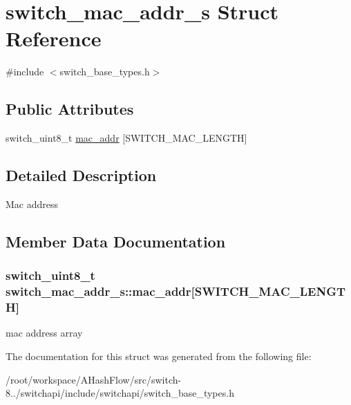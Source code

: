 \hypertarget{structswitch__mac__addr__s}{\section{switch\+\_\+mac\+\_\+addr\+\_\+s Struct Reference}
\label{structswitch__mac__addr__s}
}


{\ttfamily \#include $<$switch\+\_\+base\+\_\+types.\+h$>$}

\subsection*{Public Attributes}
\begin{DoxyCompactItemize}
\item 
switch\+\_\+uint8\+\_\+t \hyperlink{structswitch__mac__addr__s_a9d20acc7562e8be04135fa0e524649e2}{mac\+\_\+addr} \mbox{[}S\+W\+I\+T\+C\+H\+\_\+\+M\+A\+C\+\_\+\+L\+E\+N\+G\+T\+H\mbox{]}
\end{DoxyCompactItemize}


\subsection{Detailed Description}
Mac address 

\subsection{Member Data Documentation}
\hypertarget{structswitch__mac__addr__s_a9d20acc7562e8be04135fa0e524649e2}{
\subsubsection[{mac\+\_\+addr}]{\setlength{\rightskip}{0pt plus 5cm}switch\+\_\+uint8\+\_\+t switch\+\_\+mac\+\_\+addr\+\_\+s\+::mac\+\_\+addr\mbox{[}S\+W\+I\+T\+C\+H\+\_\+\+M\+A\+C\+\_\+\+L\+E\+N\+G\+T\+H\mbox{]}}}\label{structswitch__mac__addr__s_a9d20acc7562e8be04135fa0e524649e2}
mac address array 

The documentation for this struct was generated from the following file\+:\begin{DoxyCompactItemize}
\item 
/root/workspace/\+A\+Hash\+Flow/src/switch-\/8../switchapi/include/switchapi/switch\+\_\+base\+\_\+types.\+h\end{DoxyCompactItemize}
